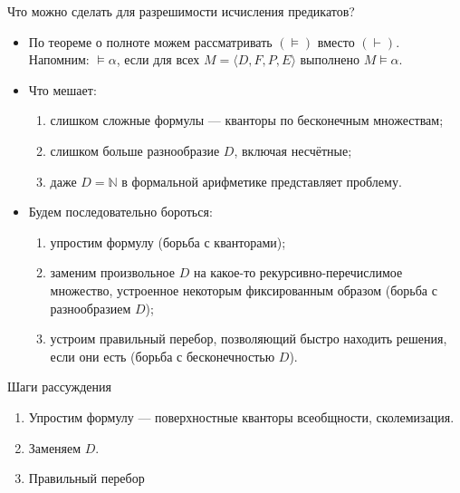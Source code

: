 \documentclass[aspectratio=169]{beamer}
\begin{document}
\begin{frame}{Что можно сделать для разрешимости исчисления предикатов?}
\begin{itemize}
\item По теореме о полноте можем рассматривать $(\models)$ вместо $(\vdash)$. 
Напомним: $\models \alpha$, если для всех $M = \langle D, F, P, E \rangle$ выполнено $M \models \alpha$.\pause
\vspace{0.3cm}

\item Что мешает:
\begin{enumerate}
\item слишком сложные формулы --- кванторы по бесконечным множествам;
\item слишком больше разнообразие $D$, включая несчётные;
\item даже $D = \mathbb{N}$ в формальной арифметике представляет проблему.
\end{enumerate}\pause
\vspace{0.3cm}

\item Будем последовательно бороться:
\begin{enumerate}
\item упростим формулу (борьба с кванторами);
\item заменим произвольное $D$ на какое-то рекурсивно-перечислимое множество, устроенное некоторым фиксированным образом (борьба с разнообразием $D$);
\item устроим правильный перебор, позволяющий быстро находить решения, если они есть (борьба с бесконечностью $D$).
\end{enumerate}
\end{itemize}
\end{frame}

\begin{frame}{Шаги рассуждения}
\begin{enumerate}
\item \color{black}Упростим формулу --- поверхностные кванторы всеобщности, сколемизация.
\item \color{gray}Заменяем $D$.
\item \color{gray}Правильный перебор
\end{enumerate}
\end{frame}
\end{document}
